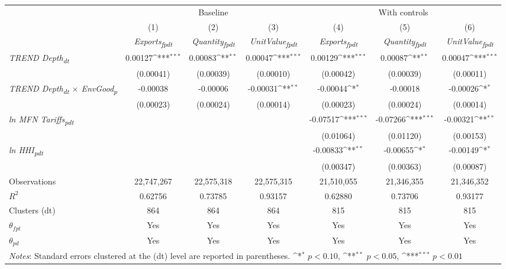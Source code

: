 {
\def\sym#1{\ifmmode^{#1}\else\(^{#1}\)\fi}
\begin{tabular}{l*{6}{c}}
\toprule
&\multicolumn{3}{c}{Baseline}&\multicolumn{3}{c}{With controls}\\\cmidrule(lr){2-4}\cmidrule(lr){5-7}
&(1)&(2)&(3)&(4)&(5)&(6)\\
&\textit{Exports\textsubscript{fpdt}}&\textit{Quantity\textsubscript{fpdt}}&\textit{UnitValue\textsubscript{fpdt}}&\textit{Exports\textsubscript{fpdt}}&\textit{Quantity\textsubscript{fpdt}}&\textit{UnitValue\textsubscript{fpdt}}\\
\midrule
\textit{TREND Depth\textsubscript{dt}} & 0.00127\sym{***} & 0.00083\sym{**} & 0.00047\sym{***} & 0.00129\sym{***} & 0.00087\sym{**} & 0.00047\sym{***}\\
 & (0.00041) & (0.00039) & (0.00010) & (0.00042) & (0.00039) & (0.00011)\\
\addlinespace
\textit{TREND Depth\textsubscript{dt} $\times$ EnvGood\textsubscript{p}} & -0.00038 & -0.00006 & -0.00031\sym{**} & -0.00044\sym{*} & -0.00018 & -0.00026\sym{*}\\
 & (0.00023) & (0.00024) & (0.00014) & (0.00023) & (0.00024) & (0.00014)\\
\addlinespace
\textit{ln MFN Tariffs\textsubscript{pdt}} &  &  &  & -0.07517\sym{***} & -0.07266\sym{***} & -0.00321\sym{**}\\
 &  &  &  & (0.01064) & (0.01120) & (0.00153)\\
\addlinespace
\textit{ln HHI\textsubscript{pdt}} &  &  &  & -0.00833\sym{**} & -0.00655\sym{*} & -0.00149\sym{*}\\
 &  &  &  & (0.00347) & (0.00363) & (0.00087)\\
\midrule
Observations & 22,747,267 & 22,575,318 & 22,575,315 & 21,510,055 & 21,346,355 & 21,346,352\\
$R^{2}$ & 0.62756 & 0.73785 & 0.93157 & 0.62880 & 0.73706 & 0.93177\\
Clusters (dt) & 864 & 864 & 864 & 815 & 815 & 815\\
$\theta_{fpt}$ & Yes & Yes & Yes & Yes & Yes & Yes\\
$\theta_{pd}$ & Yes & Yes & Yes & Yes & Yes & Yes\\
\bottomrule
\multicolumn{7}{l}{\footnotesize \textit{Notes}: Standard errors clustered at the (dt) level are reported in parentheses. \sym{*} \(p<0.10\), \sym{**} \(p<0.05\), \sym{***} \(p<0.01\)}\\
\end{tabular}
}
